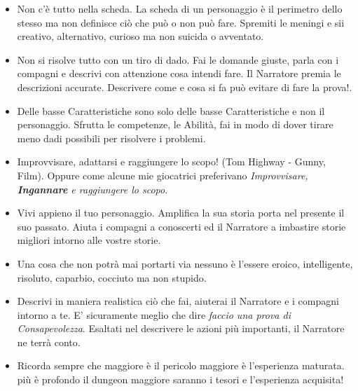 \begin{multicols}{2}
\begin{itemize}[leftmargin=*]
\item
Non c'è tutto nella scheda. La scheda di un personaggio è il perimetro dello stesso ma non definisce ciò che può o non può fare. Spremiti le meningi e sii creativo, alternativo, curioso ma non suicida o avventato.

\item
Non si risolve tutto con un tiro di dado. Fai le domande giuste, parla con i compagni e descrivi con attenzione cosa intendi fare. Il Narratore premia le descrizioni accurate. Descrivere come e cosa si fa può evitare di fare la prova!.

\item
Delle basse Caratteristiche sono solo delle basse Caratteristiche e non il personaggio. Sfrutta le competenze, le Abilità, fai in modo di dover tirare meno dadi possibili per risolvere i problemi.

\item
Improvvisare, adattarsi e raggiungere lo scopo! (Tom Highway - Gunny, Film). Oppure come alcune mie giocatrici preferivano \emph{Improvvisare, \textbf{Ingannare} e raggiungere lo scopo}.

\item
Vivi appieno il tuo personaggio. Amplifica la sua storia porta nel presente il suo passato. Aiuta i compagni a conoscerti ed il Narratore a imbastire storie migliori intorno alle vostre storie.

\item
Una cosa che non potrà mai portarti via nessuno è l'essere eroico, intelligente, risoluto, caparbio, cocciuto ma non stupido.

\item
Descrivi in maniera realistica ciò che fai, aiuterai il Narratore e i compagni intorno a te. E' sicuramente meglio che dire \emph{faccio una prova di Consapevolezza}. Esaltati nel descrivere le azioni più importanti, il Narratore ne terrà conto.


\item
Ricorda sempre che maggiore è il pericolo maggiore è l'esperienza maturata. più è profondo il dungeon maggiore saranno i tesori e l'esperienza acquisita!


\end{itemize}
\end{multicols}
